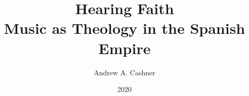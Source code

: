 \documentclass{tex/vcbook}
\title{Hearing Faith\\
Music as Theology in the Spanish Empire}
\author{Andrew A. Cashner}
\date{2020}
\begin{document}
\maketitle

\frontmatter


\tableofcontents* \clearpage
\listoffigures
\listofdiagrams
\listoftables
\listofpoemexamples
\listofmusicexamples

\mainmatter







\backmatter


\end{document}
